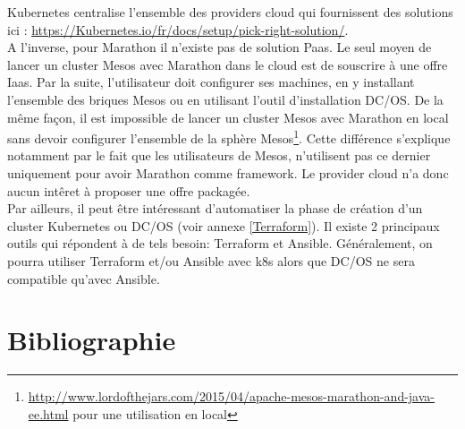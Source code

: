 \documentclass[11pt,fleqn]{book} %
\begin{document}
Kubernetes centralise l'ensemble des providers cloud qui fournissent des solutions ici : \url{https://Kubernetes.io/fr/docs/setup/pick-right-solution/}. \\

A l'inverse, pour Marathon il n'existe pas de solution Paas. Le seul moyen de lancer un cluster Mesos avec Marathon dans le cloud est de souscrire à une offre Iaas. Par la suite, l'utilisateur doit configurer ses machines, en y installant l'ensemble des briques Mesos ou en utilisant l'outil d'installation DC/OS. De la même façon, il est impossible de lancer un cluster Mesos avec Marathon en local sans devoir configurer l'ensemble de la sphère Mesos\footnote{\url{http://www.lordofthejars.com/2015/04/apache-mesos-marathon-and-java-ee.html} pour une utilisation en local}. Cette différence s'explique notamment par le fait que les utilisateurs de Mesos, n'utilisent pas ce dernier uniquement pour avoir Marathon comme framework. Le provider cloud n'a donc aucun intêret à proposer une offre packagée.\\

Par ailleurs, il peut être intéressant d'automatiser la phase de création d'un cluster Kubernetes ou DC/OS (voir annexe \ref{Terraform}). Il existe 2 principaux outils qui répondent à de tels besoin: Terraform et Ansible. Généralement, on pourra utiliser Terraform et/ou Ansible avec k8s alors que DC/OS ne sera compatible qu'avec Ansible.


\printglossaries
{}

\chapter*{Bibliographie}
\nocite{*}
\vspace{-2cm}
\printbibliography[heading=bibempty]


\cleardoublepage
{}
\setlength{\columnsep}{0.75cm}
\printindex

\end{document}
